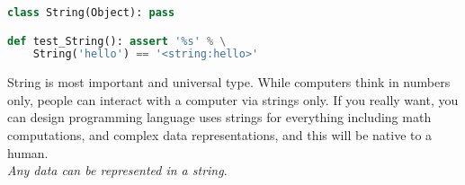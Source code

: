 \clearpage{}

\begin{lstlisting}[language=Python]
class String(Object): pass

def test_String(): assert '%s' % \
    String('hello') == '<string:hello>'
\end{lstlisting}

\noindent
String is most important and universal type. While computers think in numbers
only, people can interact with a computer via strings only. If you really want,
you can design programming language uses strings for everything including math
computations, and complex data representations, and this will be native to a
human.\\\emph{Any data can be represented in a string}.
